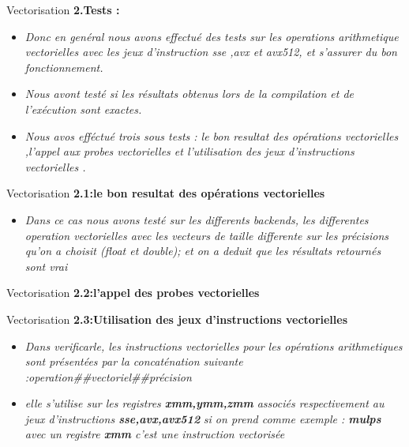 \documentclass{beamer}
\begin{document}
\begin{frame}{Vectorisation}
\textbf{2.Tests :}
  \begin{itemize}
        \item\textit{Donc en genéral nous avons effectué des tests sur les operations arithmetique vectorielles avec les jeux d'instruction sse ,avx et avx512, et s'assurer du bon fonctionnement. } 
         \item\textit{Nous avont testé si les résultats obtenus lors de la compilation et de l’exécution sont exactes.} 
        
         \item \textit{Nous avos efféctué trois sous tests : le bon resultat des opérations vectorielles ,l'appel aux probes vectorielles et l'utilisation des jeux d'instructions vectorielles .}  
         
         \end{itemize}
         \end{frame}
\begin{frame}{Vectorisation}         
\textbf{2.1:le bon resultat des opérations vectorielles}
  \begin{itemize}
        \item\textit{Dans ce cas nous avons testé sur les differents backends, les differentes operation vectorielles avec les vecteurs de taille differente sur les précisions qu'on a choisit (float et double);
        et on a deduit que les résultats retournés sont vrai
        } 
        \end{itemize}
\end{frame}

\begin{frame}{Vectorisation}         
\textbf{2.2:l'appel des probes vectorielles}
        
\end{frame}

\begin{frame}{Vectorisation}         
\textbf{2.3:Utilisation des jeux d’instructions vectorielles}
  \begin{itemize}
     \item\textit{Dans verificarle, les instructions vectorielles pour les opérations arithmetiques sont présentées par la concaténation suivante :operation##vectoriel##précision } 
      \item\textit{elle s'utilise sur les registres \textbf{xmm,ymm,zmm } associés respectivement au jeux d'instructions \textbf{sse,avx,avx512} } 
      \textit{si on prend comme exemple : \textbf{mulps} avec un registre \textbf{xmm} c'est une instruction vectorisée} 
   \end{itemize}
\end{frame}
\end{document}
